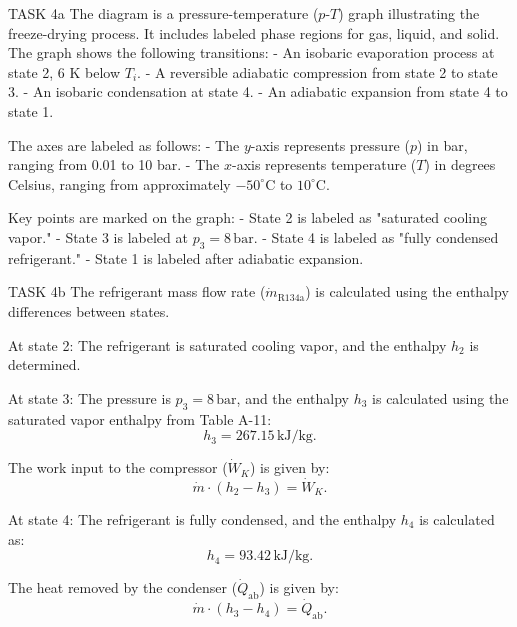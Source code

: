 TASK 4a  
The diagram is a pressure-temperature (\(p\)-\(T\)) graph illustrating the freeze-drying process. It includes labeled phase regions for gas, liquid, and solid. The graph shows the following transitions:  
- An isobaric evaporation process at state 2, 6 K below \(T_i\).  
- A reversible adiabatic compression from state 2 to state 3.  
- An isobaric condensation at state 4.  
- An adiabatic expansion from state 4 to state 1.  

The axes are labeled as follows:  
- The \(y\)-axis represents pressure (\(p\)) in bar, ranging from 0.01 to 10 bar.  
- The \(x\)-axis represents temperature (\(T\)) in degrees Celsius, ranging from approximately \(-50^\circ\text{C}\) to \(10^\circ\text{C}\).  

Key points are marked on the graph:  
- State 2 is labeled as "saturated cooling vapor."  
- State 3 is labeled at \(p_3 = 8 \, \text{bar}\).  
- State 4 is labeled as "fully condensed refrigerant."  
- State 1 is labeled after adiabatic expansion.  

TASK 4b  
The refrigerant mass flow rate (\(\dot{m}_{\text{R134a}}\)) is calculated using the enthalpy differences between states.  

At state 2:  
The refrigerant is saturated cooling vapor, and the enthalpy \(h_2\) is determined.  

At state 3:  
The pressure is \(p_3 = 8 \, \text{bar}\), and the enthalpy \(h_3\) is calculated using the saturated vapor enthalpy from Table A-11:  
\[
h_3 = 267.15 \, \text{kJ/kg}.
\]  

The work input to the compressor (\(\dot{W}_K\)) is given by:  
\[
\dot{m} \cdot (h_2 - h_3) = \dot{W}_K.
\]  

At state 4:  
The refrigerant is fully condensed, and the enthalpy \(h_4\) is calculated as:  
\[
h_4 = 93.42 \, \text{kJ/kg}.
\]  

The heat removed by the condenser (\(\dot{Q}_{\text{ab}}\)) is given by:  
\[
\dot{m} \cdot (h_3 - h_4) = \dot{Q}_{\text{ab}}.
\]